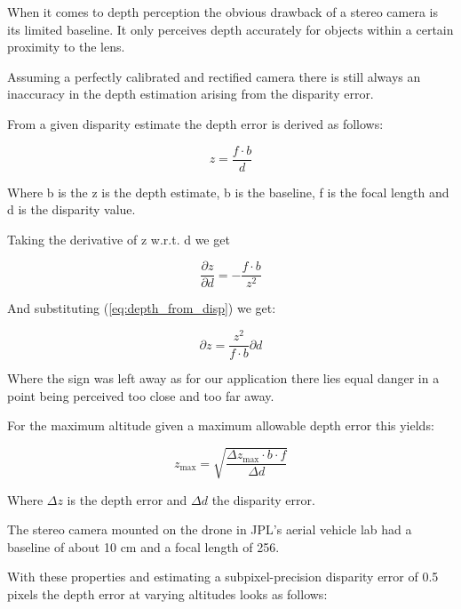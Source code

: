 When it comes to depth perception the obvious drawback of a stereo camera is its limited baseline. It only perceives depth accurately for objects within a certain proximity to the lens. 

Assuming a perfectly calibrated and rectified camera there is still always an inaccuracy in the depth estimation arising from the disparity error.

From a given disparity estimate the depth error is derived as follows:

\begin{equation}\label{eq:depth_from_disp}
    z = \frac{f \cdot b}{d}
\end{equation}

Where b is the z is the depth estimate, b is the baseline, f is the focal length and d is the disparity value.

Taking the derivative of z w.r.t. d we get

\begin{equation}
    \frac{\partial z}{\partial d} = - \frac{f  \cdot b}{z^2}
\end{equation}

And substituting (\cref{eq:depth_from_disp}) we get:

\begin{equation}
    {\partial z} = \frac{z^2}{f  \cdot b}\partial d
\end{equation}

Where the sign was left away as for our application there lies equal danger in a point being perceived too close and too far away.

For the maximum altitude given a maximum allowable depth error this yields:

\begin{equation}
    z_{\text{max}} = \sqrt{\frac{\Delta z_{\text{max}} \cdot b \cdot f}{\Delta d}}
\end{equation}

Where $\Delta z$ is the depth error and $\Delta d$ the disparity error.

The stereo camera mounted on the drone in JPL's aerial vehicle lab had a baseline of about 10 cm and a focal length of 256.

With these properties and estimating a subpixel-precision disparity error of 0.5 pixels the depth error at varying altitudes looks as follows:

